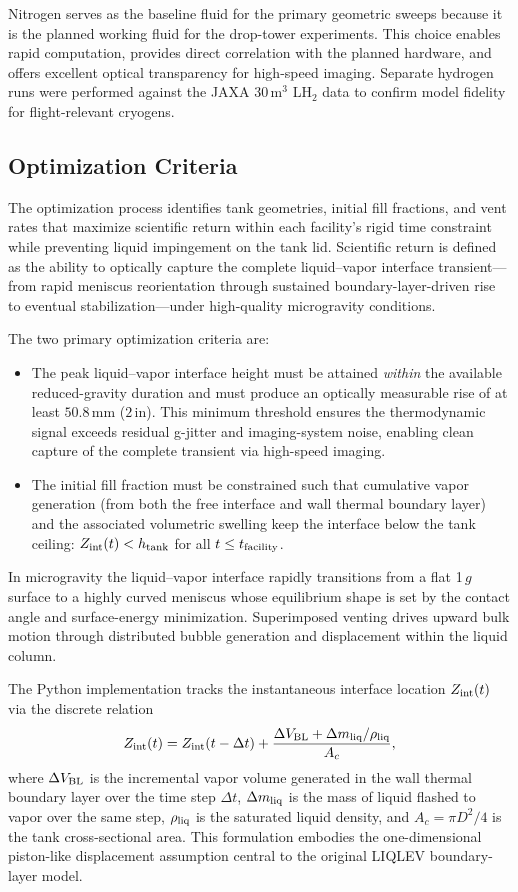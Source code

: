 \documentclass[conf]{new-aiaa}
\begin{document}
Nitrogen serves as the baseline fluid for the primary geometric sweeps because it is the planned working fluid for the drop-tower experiments. This choice enables rapid computation, provides direct correlation with the planned hardware, and offers excellent optical transparency for high-speed imaging. Separate hydrogen runs were performed against the JAXA $30\,\text{m}^3$ LH$_2$ data to confirm model fidelity for flight-relevant cryogens.

\subsection{Optimization Criteria}
The optimization process identifies tank geometries, initial fill fractions, and vent rates that maximize scientific return within each facility's rigid time constraint while preventing liquid impingement on the tank lid. Scientific return is defined as the ability to optically capture the complete liquid--vapor interface transient---from rapid meniscus reorientation through sustained boundary-layer-driven rise to eventual stabilization---under high-quality microgravity conditions.

The two primary optimization criteria are:
\begin{itemize}
    \item The peak liquid--vapor interface height must be attained \textit{within} the available reduced-gravity duration and must produce an optically measurable rise of at least $50.8\,\text{mm}$ ($2\,\text{in}$). This minimum threshold ensures the thermodynamic signal exceeds residual g-jitter and imaging-system noise, enabling clean capture of the complete transient via high-speed imaging.
    \item The initial fill fraction must be constrained such that cumulative vapor generation (from both the free interface and wall thermal boundary layer) and the associated volumetric swelling keep the interface below the tank ceiling: $Z_{\rm int}(t) < h_{\rm tank}$ for all $t \leq t_{\rm facility}$.
\end{itemize}

In microgravity the liquid--vapor interface rapidly transitions from a flat 1\,$g$ surface to a highly curved meniscus whose equilibrium shape is set by the contact angle and surface-energy minimization. Superimposed venting drives upward bulk motion through distributed bubble generation and displacement within the liquid column.

The Python implementation tracks the instantaneous interface location $Z_{\rm int}(t)$ via the discrete relation
\[
Z_{\rm int}(t) = Z_{\rm int}(t-\Delta t) + \frac{\Delta V_{\rm BL} + \Delta m_{\rm liq}/\rho_{\rm liq}}{A_c},
\]
where $\Delta V_{\rm BL}$ is the incremental vapor volume generated in the wall thermal boundary layer over the time step $\Delta t$, $\Delta m_{\rm liq}$ is the mass of liquid flashed to vapor over the same step, $\rho_{\rm liq}$ is the saturated liquid density, and $A_c = \pi D^2/4$ is the tank cross-sectional area. This formulation embodies the one-dimensional piston-like displacement assumption central to the original LIQLEV boundary-layer model.
\end{document}
